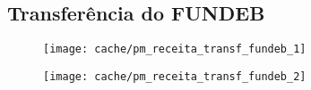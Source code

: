 
\subsection{Transferência do FUNDEB}





\begin{figure}[H]
\center
\texttt{[image: cache/pm\_receita\_transf\_fundeb\_1]}
\end{figure}

\begin{figure}[H]
\center
\texttt{[image: cache/pm\_receita\_transf\_fundeb\_2]}
\end{figure}
